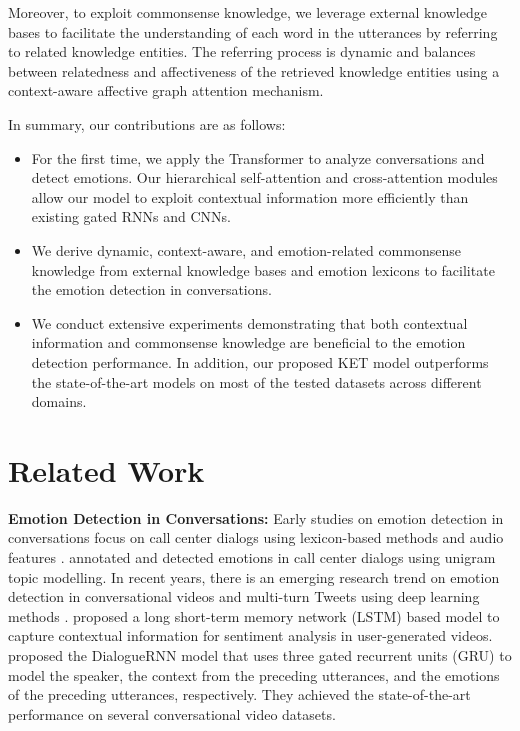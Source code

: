 \documentclass[11pt,a4paper]{article}
\begin{document}
Moreover, to exploit commonsense knowledge, we leverage external knowledge bases to facilitate the understanding of each word in the utterances by referring to related knowledge entities. The referring process is dynamic and balances between relatedness and affectiveness of the retrieved knowledge entities using a context-aware affective graph attention mechanism. 



In summary, our contributions are as follows:
\begin{itemize}
    \item For the first time, we apply the Transformer to analyze conversations and detect emotions. Our hierarchical self-attention and cross-attention modules allow our model to exploit contextual information more efficiently than existing gated RNNs and CNNs.
    \item We derive dynamic, context-aware, and emotion-related commonsense knowledge from external knowledge bases and emotion lexicons to facilitate the emotion detection in conversations.
    \item We conduct extensive experiments demonstrating that both contextual information and commonsense knowledge are beneficial to the emotion detection performance. In addition, our proposed KET model outperforms the state-of-the-art models on most of the tested datasets across different domains.
\end{itemize}









\section{Related Work}
\label{related work}

\noindent\textbf{Emotion Detection in Conversations:} Early studies on emotion detection in conversations focus on call center dialogs using lexicon-based methods and audio features \cite{lee2005toward, devillers2006real}. \citet{devillers2002annotation} annotated and detected emotions in call center dialogs using unigram topic modelling. 
In recent years, there is an emerging research trend on emotion detection in conversational videos and multi-turn Tweets using deep learning methods \cite{hazarika2018conversational, hazarika2018icon, zahiri2018emotion, chatterjee2019understanding, zhong2019ntuer, poria2019emotion}. \citet{poria2017context} proposed a long short-term memory network (LSTM) \cite{hochreiter1997long} based model to capture contextual information for sentiment analysis in user-generated videos. 
\citet{majumder2018dialoguernn} proposed the DialogueRNN model that uses three gated recurrent units (GRU) \cite{cho2014learning} to model the speaker, the context from the preceding utterances, and the emotions of the preceding utterances, respectively. They achieved the state-of-the-art performance on several conversational video datasets.
\end{document}
